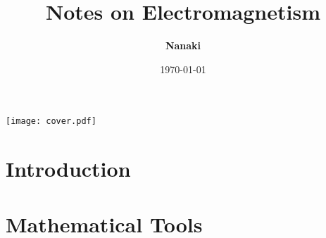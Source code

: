 \documentclass[
    ebook,
    11pt,
    twoside,
    onecolumn,
    openright,
    final
]{memoir}
\begin{document}
\begin{titlingpage}
    \title{\HUGE\textbf{Notes on Electromagnetism}}
    \author{\Large\textbf{Nanaki}}
    \date{\Large{\today}}

    \maketitle
    \texttt{[image: cover.pdf]}
\end{titlingpage}

\frontmatter

\tableofcontents

\mainmatter

\chapter{Introduction}

\appendix

\chapter{Mathematical Tools}

\backmatter
\end{document}
